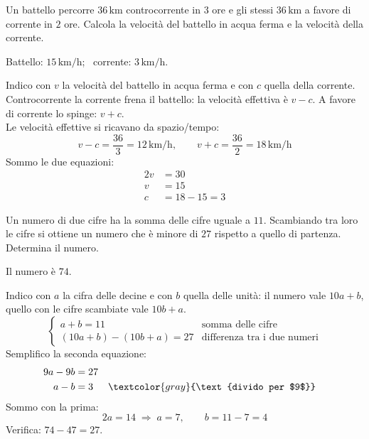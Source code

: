 
\begin{question}[ID=3.7, subtitle={Battello e corrente del fiume}, difficulty=difficile, tags={sistemi, problemi, moto}]
Un battello percorre $36\,\text{km}$ controcorrente in $3$ ore e gli stessi $36\,\text{km}$ a favore di corrente in $2$ ore. Calcola la velocità del battello in acqua ferma e la velocità della corrente.
\begin{solution}
Battello: $15\,\text{km/h}$; \ corrente: $3\,\text{km/h}$.
\end{solution}
\begin{explanation}
Indico con $v$ la velocità del battello in acqua ferma e con $c$ quella della corrente. \\
Controcorrente la corrente frena il battello: la velocità effettiva è $v-c$. A favore di corrente lo spinge: $v+c$. \\
Le velocità effettive si ricavano da spazio/tempo:
\[ v-c=\dfrac{36}{3}=12\,\text{km/h}, \qquad v+c=\dfrac{36}{2}=18\,\text{km/h} \]
Sommo le due equazioni:
\[\begin{aligned}
2v &= 30\\
v &= 15\\
c &= 18-15=3
\end{aligned}\]
\end{explanation}
\end{question}


\begin{question}[ID=3.8, subtitle={Numero di due cifre}, difficulty=difficile, tags={sistemi, problemi, numeri}]
Un numero di due cifre ha la somma delle cifre uguale a $11$. Scambiando tra loro le cifre si ottiene un numero che è minore di $27$ rispetto a quello di partenza. Determina il numero.
\begin{solution}
Il numero è $74$.
\end{solution}
\begin{explanation}
Indico con $a$ la cifra delle decine e con $b$ quella delle unità: il numero vale $10a+b$, quello con le cifre scambiate vale $10b+a$.
\[ \begin{cases} a+b=11 & \text{somma delle cifre}\\ (10a+b)-(10b+a)=27 & \text{differenza tra i due numeri}\end{cases} \]
Semplifico la seconda equazione:
\[\begin{aligned}
9a-9b &= 27\\
a-b &= 3 && \textcolor{gray}{\text{divido per $9$}}
\end{aligned}\]
Sommo con la prima:
\[ 2a=14 \;\Rightarrow\; a=7, \qquad b=11-7=4 \]
Verifica: $74-47=27$.
\end{explanation}
\end{question}

